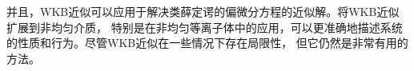 \documentclass[12pt, a4paper, oneside]{ctexart}
\begin{document}
\begin{spacing}{2.0}
并且，WKB近似可以应用于解决类薛定谔的偏微分方程的近似解。将WKB近似扩展到非均匀介质，
特别是在非均匀等离子体中的应用，可以更准确地描述系统的性质和行为。尽管WKB近似在一些情况下存在局限性，
但它仍然是非常有用的方法。








\end{spacing}{}



\end{document}
